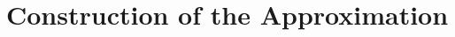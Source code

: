 \documentclass[../fem.tex]{subfile}
\begin{document}
\section{Construction of the Approximation}%
\label{sec:construction_of_the_approximation}
\end{document}
